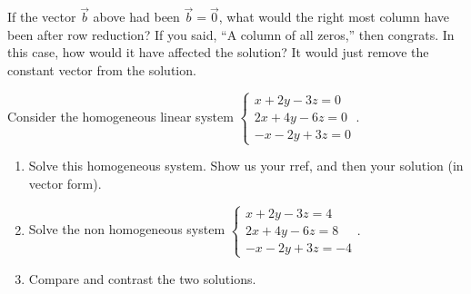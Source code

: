 If the vector $\vec b$ above had been $\vec b=\vec 0$, what would the right most column have been after row reduction?  If you said, ``A column of all zeros,'' then congrats.  In this case, how would it have affected the solution? It would just remove the constant vector from the solution. 

\begin{problem}
Consider the homogeneous linear system $\begin{cases}x+2y-3z=0\\ 2x+4y-6z=0\\ -x-2y+3z=0\end{cases}.$ 
\begin{enumerate}
 \item Solve this homogeneous system. Show us your rref, and then your solution (in vector form).
 \item Solve the non homogeneous system $\begin{cases}x+2y-3z=4\\ 2x+4y-6z=8\\ -x-2y+3z=-4\end{cases}.$
 \item Compare and contrast the two solutions.
\end{enumerate}
\end{problem}


